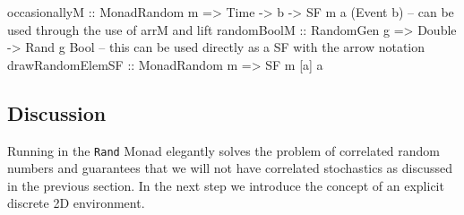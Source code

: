 \begin{HaskellCode}
occasionallyM :: MonadRandom m => Time -> b -> SF m a (Event b)
-- can be used through the use of arrM and lift
randomBoolM :: RandomGen g => Double -> Rand g Bool
-- this can be used directly as a SF with the arrow notation
drawRandomElemSF :: MonadRandom m => SF m [a] a
\end{HaskellCode}

\subsection{Discussion} 
Running in the \texttt{Rand} Monad elegantly solves the problem of correlated random numbers and guarantees that we will not have correlated stochastics as discussed in the previous section. In the next step we introduce the concept of an explicit discrete 2D environment.